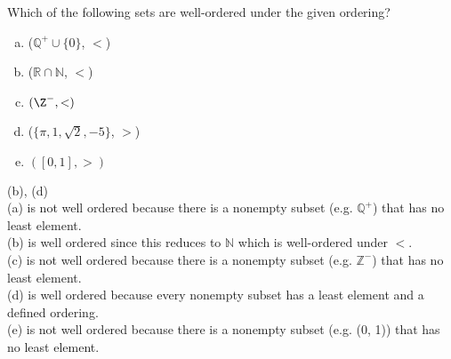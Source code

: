 

Which of the following sets are well-ordered under the given ordering?
\begin{enumerate}[(a)]
	\item  ($\mathbb{Q^+} \cup \{0\}$, $<$)

	\item  ($\mathbb{R} \cap \mathbb{N}$, $<$)

	\item  $(\Z^-, <)$

	\item  ($\{\pi, 1, \sqrt{2}, -5\}$, $>$)

	\item  $([0,1], >)$

\end{enumerate}
\begin{solution}

(b), (d)\\
(a) is not well ordered because there is a nonempty subset (e.g. $\mathbb{Q^+}$) that has no least element.\\
(b) is well ordered since this reduces to $\mathbb{N}$ which is well-ordered under $<$.\\
(c) is not well ordered because there is a nonempty subset (e.g. $\mathbb{Z^-}$) that has no least element.\\
(d) is well ordered because every nonempty subset has a least element and a defined ordering.\\
(e) is not well ordered because there is a nonempty subset (e.g. (0, 1)) that has no least element.

\end{solution}